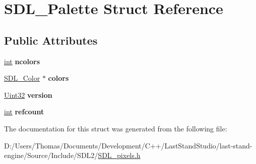 \hypertarget{structSDL__Palette}{}\section{S\+D\+L\+\_\+\+Palette Struct Reference}
\label{structSDL__Palette}
\subsection*{Public Attributes}
\begin{DoxyCompactItemize}
\item 
\hypertarget{structSDL__Palette_a81a0cc3197480e994c6b06f1f0567091}{}\hyperlink{SDL__thread_8h_a6a64f9be4433e4de6e2f2f548cf3c08e}{int} {\bfseries ncolors}\label{structSDL__Palette_a81a0cc3197480e994c6b06f1f0567091}

\item 
\hypertarget{structSDL__Palette_ad757a50037f43533196e94942440b241}{}\hyperlink{structSDL__Color}{S\+D\+L\+\_\+\+Color} $\ast$ {\bfseries colors}\label{structSDL__Palette_ad757a50037f43533196e94942440b241}

\item 
\hypertarget{structSDL__Palette_a5b8d45519f6850a32f13f1602ce37a8e}{}\hyperlink{SDL__stdinc_8h_add440eff171ea5f55cb00c4a9ab8672d}{Uint32} {\bfseries version}\label{structSDL__Palette_a5b8d45519f6850a32f13f1602ce37a8e}

\item 
\hypertarget{structSDL__Palette_a35c667737f883f973bb0a8dea143b08d}{}\hyperlink{SDL__thread_8h_a6a64f9be4433e4de6e2f2f548cf3c08e}{int} {\bfseries refcount}\label{structSDL__Palette_a35c667737f883f973bb0a8dea143b08d}

\end{DoxyCompactItemize}


The documentation for this struct was generated from the following file\+:\begin{DoxyCompactItemize}
\item 
D\+:/\+Users/\+Thomas/\+Documents/\+Development/\+C++/\+Last\+Stand\+Studio/last-\/stand-\/engine/\+Source/\+Include/\+S\+D\+L2/\hyperlink{SDL__pixels_8h}{S\+D\+L\+\_\+pixels.\+h}\end{DoxyCompactItemize}
